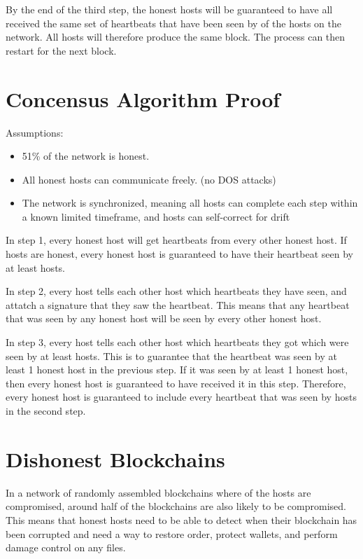 \documentclass[twocolumn]{article}
\begin{document}
By the end of the third step, the honest hosts will be guaranteed to have all received the same set of heartbeats that have been seen by \fiftyone \space of the hosts on the network.
All hosts will therefore produce the same block.
The process can then restart for the next block.

\section{Concensus Algorithm Proof}

Assumptions:
\begin{itemize}
	\item 51\% of the network is honest.
	\item All honest hosts can communicate freely. (no DOS attacks)
	\item The network is synchronized, meaning all hosts can complete each step within a known limited timeframe, and hosts can self-correct for drift
\end{itemize}

In step 1, every honest host will get heartbeats from every other honest host.
If \fiftyone \space hosts are honest, every honest host is guaranteed to have their heartbeat seen by at least \fiftyone \space hosts.

In step 2, every host tells each other host which heartbeats they have seen, and attatch a signature that they saw the heartbeat.
This means that any heartbeat that was seen by any honest host will be seen by every other honest host.

In step 3, every host tells each other host which heartbeats they got which were seen by at least \fiftyone \space hosts.
This is to guarantee that the heartbeat was seen by at least 1 honest host in the previous step.
If it was seen by at least 1 honest host, then every honest host is guaranteed to have received it in this step.
Therefore, every honest host is guaranteed to include every heartbeat that was seen by \fiftyone \space hosts in the second step.

\section{Dishonest Blockchains}

In a network of randomly assembled blockchains where \fortynine \space of the hosts are compromised, around half of the blockchains are also likely to be compromised.
This means that honest hosts need to be able to detect when their blockchain has been corrupted and need a way to restore order, protect wallets, and perform damage control on any files.
\end{document}
